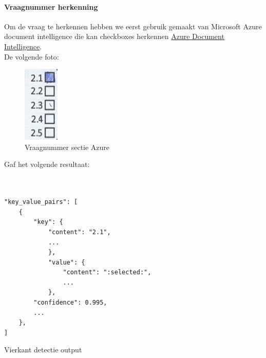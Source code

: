 \documentclass[12pt]{article}
\begin{document}
\begin{multicols}{2}
\paragraph*{Vraagnummer herkenning} Om de vraag te herkennen hebben we eerst gebruik gemaakt van Microsoft Azure document intelligence die kan checkboxes herkennen \href{https://azure.microsoft.com/en-us/products/ai-services/ai-document-intelligence}{Azure Document Intelligence}.\\
De volgende foto:
\begin{figure}[H]
    \centering
    \includegraphics[width=0.2\linewidth]{./images/methoden/inscannen/sectie/checkbox/vraagnummer/answer_section.png}
    \caption{Vraagnummer sectie Azure}
    \label{fig:sec-azure}
\end{figure}
Gaf het volgende resultaat: 
\begin{listing}[H]
\begin{verbatim}


"key_value_pairs": [
    {
        "key": {
            "content": "2.1",
            ...
            },
            "value": {
                "content": ":selected:",
                ...
            },
        "confidence": 0.995,
        ...
    },
]

\end{verbatim}
\caption{Vierkant detectie output} 
\label{json-example}
\end{listing}


\end{multicols}
\end{document}
